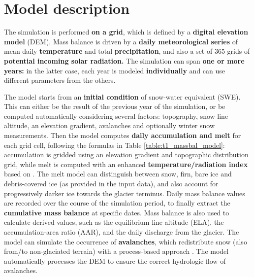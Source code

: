 \documentclass[15pt]{extarticle}
\begin{document}
\section{Model description}
The simulation is performed \textbf{on a grid}, which is defined by a \textbf{digital elevation model} (DEM). Mass balance is driven by a \textbf{daily meteorological series} of mean daily \textbf{temperature} and total \textbf{precipitation}, and also a set of 365 grids of \textbf{potential incoming solar radiation.} The simulation can span \textbf{one or more years:} in the latter case, each year is modeled \textbf{individually} and can use different parameters from the others.

The model starts from an \textbf{initial condition} of snow-water equivalent (SWE). This can either be the result of the previous year of the simulation, or be computed automatically considering several factors: topography, snow line altitude, an elevation gradient, avalanches and optionally winter snow measurements. Then the model computes \textbf{daily accumulation and melt} for each grid cell, following the formulas in Table \ref{table:t1_massbal_model}: accumulation is gridded using an elevation gradient and topographic distribution grid, while melt is computed with an enhanced \textbf{temperature/radiation index} based on \citet{hock_distributed_1999}. The melt model can distinguish between snow, firn, bare ice and debris-covered ice (as provided in the input data), and also account for progressively darker ice towards the glacier terminus. Daily mass balance values are recorded over the course of the simulation period, to finally extract the \textbf{cumulative mass balance} at specific dates. Mass balance is also used to calculate derived values, such as the equilibrium line altitude (ELA), the accumulation-area ratio (AAR), and the daily discharge from the glacier. The model can simulate the occurrence of \textbf{avalanches}, which redistribute snow (also from/to non-glaciated terrain) with a process-based approach \citep{gruber_mass-conserving_2007}. The model automatically processes the DEM to ensure the correct hydrologic flow of avalanches.
\end{document}

